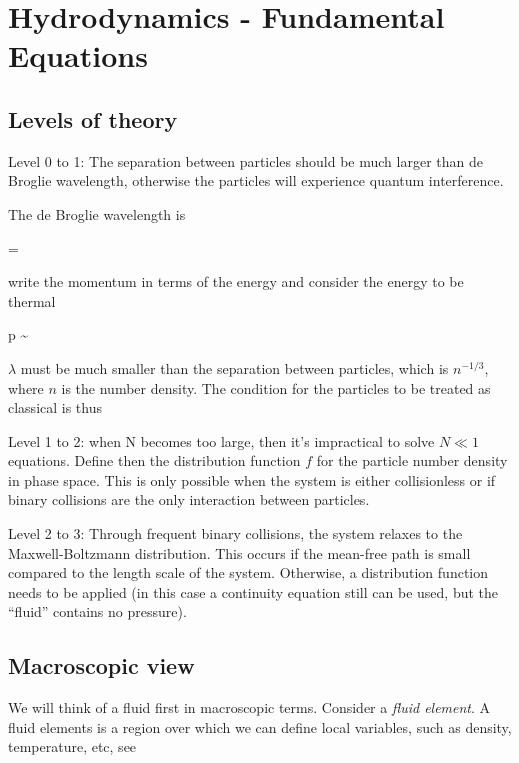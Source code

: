 

\chapter{Hydrodynamics - Fundamental Equations}


\section{Levels of theory}

Level 0 to 1:  The separation between particles should be much larger
than de Broglie wavelength, otherwise the particles will experience
quantum interference. 

The de Broglie wavelength is 

\beq
\lambda = 
\eeq

\noindent write the momentum in terms of the energy and consider the energy to
be thermal

\beq
p  \sim {}
\eeq

\noindent $\lambda$ must be much smaller than the separation between particles,
which is $n^{-1/3}$, where $n$ is the number density. The condition
for the particles to be treated as classical is thus 

\beq
{} 
\eeq


Level 1 to 2: when N becomes too large, then it's impractical to solve
$N\ll 1$ equations. Define then the distribution function $f$ for the
particle number density in phase space. This is only possible when the
system is either collisionless or if binary collisions are the only
interaction between particles.

Level 2 to 3: Through frequent binary collisions, the system relaxes
to the Maxwell-Boltzmann distribution. This occurs if the mean-free
path is small compared to the length scale of the system. Otherwise, a
distribution function needs to be applied (in this case a continuity
equation still can be used, but the ``fluid'' contains no pressure). 


\section{Macroscopic view}

We will think of a fluid first in macroscopic terms. Consider a 
{\it fluid element}. A fluid elements is a region over which we can
define local variables, such as density, temperature, etc, see 

